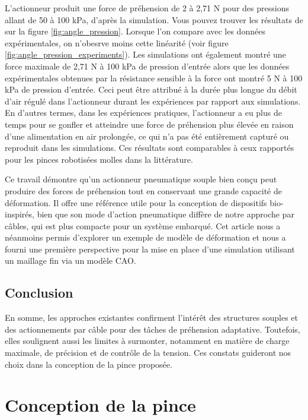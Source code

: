 \documentclass[a4paper, 11pt]{report}
\begin{document}
            L'actionneur produit une force de préhension de 2 à 2,71 N pour des pressions allant de 50 à 100 kPa, d'après la simulation. Vous pouvez trouver les résultats de sur la figure \ref{fig:angle_pression}. Lorsque l'on compare avec les données expérimentales, on n'obesrve moins cette linéarité (voir figure \ref{fig:angle_pression_experiments}). Les simulations ont également montré une force maximale de 2,71 N à 100 kPa de pression d'entrée alors que les données expérimentales obtenues par la résistance sensible à la force ont montré 5 N à 100 kPa de pression d'entrée. Ceci peut être attribué à la durée plus longue du débit d'air régulé dans l'actionneur durant les expériences par rapport aux simulations. En d'autres termes, dans les expériences pratiques, l'actionneur a eu plus de temps pour se gonfler et atteindre une force de préhension plus élevée en raison d'une alimentation en air prolongée, ce qui n'a pas été entièrement capturé ou reproduit dans les simulations. Ces résultats sont comparables à ceux rapportés pour les pinces robotisées molles dans la littérature. \cite{bhat_numerical_2025}

            Ce travail démontre qu'un actionneur pneumatique souple bien conçu peut produire des forces de préhension tout en conservant une grande capacité de déformation. Il offre une référence utile pour la conception de dispositifs bio-inspirés, bien que son mode d'action pneumatique diffère de notre approche par câbles, qui est plus compacte pour un système embarqué. Cet article nous a néanmoins permis d'explorer un exemple de modèle de déformation et nous a fourni une première perspective pour la mise en place d'une simulation utilisant un maillage fin via un modèle CAO.
    
    \subsection{Conclusion}

        En somme, les approches existantes confirment l’intérêt des structures souples et des actionnements par câble pour des tâches de préhension adaptative. Toutefois, elles soulignent aussi les limites à surmonter, notamment en matière de charge maximale, de précision et de contrôle de la tension. Ces constats guideront nos choix dans la conception de la pince proposée.

\clearpage
        
\section{Conception de la pince}
        
\end{document}
